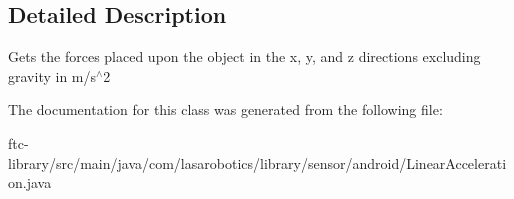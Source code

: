 \subsection{Detailed Description}
Gets the forces placed upon the object in the x, y, and z directions excluding gravity in m/s$^\wedge$2 

The documentation for this class was generated from the following file\+:\begin{DoxyCompactItemize}
\item 
ftc-\/library/src/main/java/com/lasarobotics/library/sensor/android/Linear\+Acceleration.\+java\end{DoxyCompactItemize}
